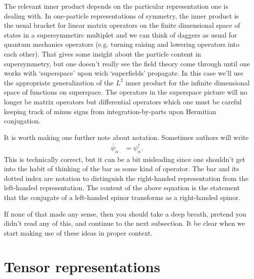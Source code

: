 The relevant inner product depends on the particular representation one is dealing with. 
In one-particle representations of symmetry, the inner product is the usual bracket for linear matrix operators on the finite dimensional space of states in a supersymmetirc multiplet and we can think of daggers as usual for quantum mechanics operators (e.g. turning raising and lowering operators into each other). That gives  some insight about the particle content in supersymmetry, but one doesn't really see the field theory come through until one works with `superspace' upon wich `superfields' propagate. In this case we'll use the appropriate generalization of the $L^2$ inner product for the infinite dimensional space of functions on superspace. The operators in the superspace picture will no longer be matrix operators but differential operators which one must be careful keeping track of minus signs from integration-by-parts upon Hermitian conjugation.

It is worth making one further note about notation. Sometimes authors will write
\begin{align}
    \overline\psi_{\dot\alpha} &= \psi^\dag_\alpha.
\end{align}
This is technically correct, but it can be a bit misleading since one shouldn't get into the habit of thinking of the bar as some kind of operator. The bar and its dotted index are notation to distinguish the right-handed representation from the left-handed representation. The content of the above equation is the statement that the conjugate of a left-handed spinor transforms as a right-handed spinor.

If none of that made any sense, then you should take a deep breath, pretend you didn't read any of this, and continue to the next subsection. It be clear when we start making use of these ideas in proper context.

\section{Tensor representations}

